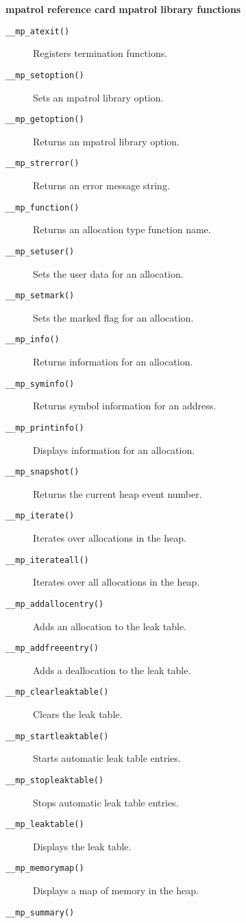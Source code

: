 \documentclass[a4paper,landscape,final]{article}
\newcommand{\heading}[1]{\textbf{\normalsize #1}}
\newcommand{\function}[1]{\texttt{#1()}}
\begin{document}
\begin{multicols}{3}{\textbf{\Large mpatrol reference card}}
\vskip 12pt
\heading{mpatrol library functions}
\vskip 6pt

\begin{description}
\item[\function{\_\_mp\_atexit}]
\hfill Registers termination functions.
\item[\function{\_\_mp\_setoption}]
\hfill Sets an mpatrol library option.
\item[\function{\_\_mp\_getoption}]
\hfill Returns an mpatrol library option.
\item[\function{\_\_mp\_strerror}]
\hfill Returns an error message string.
\item[\function{\_\_mp\_function}]
\hfill Returns an allocation type function name.
\item[\function{\_\_mp\_setuser}]
\hfill Sets the user data for an allocation.
\item[\function{\_\_mp\_setmark}]
\hfill Sets the marked flag for an allocation.
\item[\function{\_\_mp\_info}]
\hfill Returns information for an allocation.
\item[\function{\_\_mp\_syminfo}]
\hfill Returns symbol information for an address.
\item[\function{\_\_mp\_printinfo}]
\hfill Displays information for an allocation.
\item[\function{\_\_mp\_snapshot}]
\hfill Returns the current heap event number.
\item[\function{\_\_mp\_iterate}]
\hfill Iterates over allocations in the heap.
\item[\function{\_\_mp\_iterateall}]
\hfill Iterates over all allocations in the heap.
\item[\function{\_\_mp\_addallocentry}]
\hfill Adds an allocation to the leak table.
\item[\function{\_\_mp\_addfreeentry}]
\hfill Adds a deallocation to the leak table.
\item[\function{\_\_mp\_clearleaktable}]
\hfill Clears the leak table.
\item[\function{\_\_mp\_startleaktable}]
\hfill Starts automatic leak table entries.
\item[\function{\_\_mp\_stopleaktable}]
\hfill Stops automatic leak table entries.
\item[\function{\_\_mp\_leaktable}]
\hfill Displays the leak table.
\item[\function{\_\_mp\_memorymap}]
\hfill Displays a map of memory in the heap.
\item[\function{\_\_mp\_summary}]

\end{description}
\end{multicols}
\end{document}
